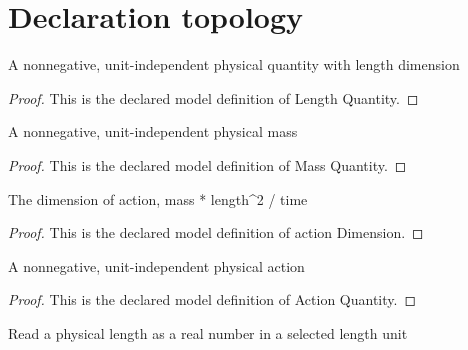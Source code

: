 \section{Declaration topology}
\begin{definition}
  \label{def:physics:phyx-mini-0500:phyxminiproblems-problemphyxmini0500-lengthquantity}
  A nonnegative, unit-independent physical quantity with length dimension
\end{definition}
\begin{proof}
  This is the declared model definition of Length Quantity.
\end{proof}
\begin{definition}
  \label{def:physics:phyx-mini-0500:phyxminiproblems-problemphyxmini0500-massquantity}
  A nonnegative, unit-independent physical mass
\end{definition}
\begin{proof}
  This is the declared model definition of Mass Quantity.
\end{proof}
\begin{definition}
  \label{def:physics:phyx-mini-0500:phyxminiproblems-problemphyxmini0500-actiondimension}
  The dimension of action, mass * length\textasciicircum{}2 / time
\end{definition}
\begin{proof}
  This is the declared model definition of action Dimension.
\end{proof}
\begin{definition}
  \label{def:physics:phyx-mini-0500:phyxminiproblems-problemphyxmini0500-actionquantity}
  A nonnegative, unit-independent physical action
\end{definition}
\begin{proof}
  This is the declared model definition of Action Quantity.
\end{proof}
\begin{definition}
  \label{def:physics:phyx-mini-0500:phyxminiproblems-problemphyxmini0500-lengthreadout}
  Read a physical length as a real number in a selected length unit
\end{definition}

